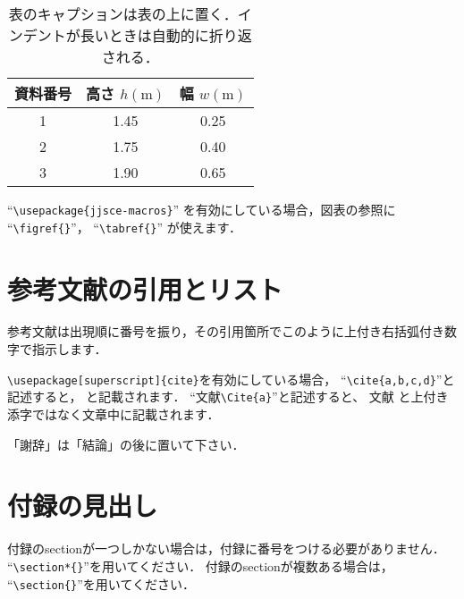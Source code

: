 \documentclass{jjsce}
\begin{document}
\begin{table}[htb]
\caption{表のキャプションは表の上に置く．インデントが長いときは自動的に折り返される．}
\label{tab:sample}
\centering
\begin{tabular}{|c|c|c|}\hline
資料番号 & 高さ $h(\mathrm{m})$ &幅 $w(\mathrm{m})$ \\\hline
1 & 1.45 & 0.25\\
2 & 1.75 & 0.40\\
3 & 1.90 & 0.65\\\hline
\end{tabular}
\end{table}
``\verb|\usepackage{jjsce-macros}|''
を有効にしている場合，図表の参照に
``\verb|\figref{}|''，
``\verb|\tabref{}|''
が使えます．

\section{参考文献の引用とリスト}
参考文献は出現順に番号を振り，その引用箇所でこのように\cite{a}上付き右括弧付き数字で指示します．

\verb|\usepackage[superscript]{cite}|を有効にしている場合，
``\verb|\cite{a,b,c,d}|''と記述すると，
\cite{a,b,c,d} と記載されます．
``文献\verb|\Cite{a}|''と記述すると、
文献\Cite{a} と上付き添字ではなく文章中に記載されます．

\Acknowledgment %
「謝辞」は「結論」の後に置いて下さい．

\appendix
\section*{付録の見出し}
付録のsectionが一つしかない場合は，付録に番号をつける必要がありません．
``\verb|\section*{}|''を用いてください．
付録のsectionが複数ある場合は，
``\verb|\section{}|''を用いてください．
\end{document}
